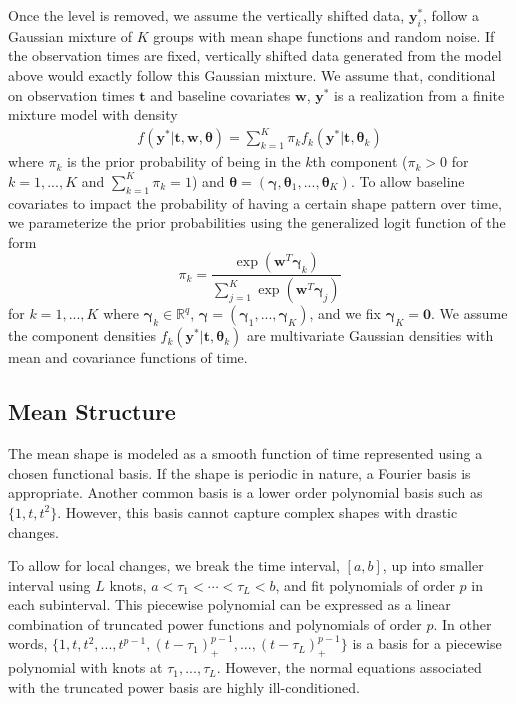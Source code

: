 \documentclass[12pt]{article}
\newcommand{\B}[0]{\mathbf}
\newcommand{\bs}[0]{\boldsymbol}
\begin{document}
Once the level is removed, we assume the vertically shifted data, $\B y_{i}^{*}$, follow a Gaussian mixture of $K$ groups with mean shape functions and random noise. If the observation times are fixed, vertically shifted data generated from the model above would exactly follow this Gaussian mixture. We assume that, conditional on observation times $\B t$ and baseline covariates $\B w$, $\B y^{*}$ is a realization from a finite mixture model with density
\begin{align*}
 f(\B y^{*}|\B t,\B w,\bs\theta) =  \sum^{K}_{k=1}\pi_{k}f_{k}( \B y^{*}|\B t,\bs\theta_{k})
\end{align*}
where $\pi_{k}$ is the prior probability of being in the $k$th component ($\pi_{k}>0$ for $k=1,...,K$ and $\sum^{K}_{k=1}\pi_{k}=1$) and $\bs\theta = (\bs\gamma,\bs\theta_{1},...,\bs\theta_{K})$. To allow baseline covariates to impact the probability of having a certain shape pattern over time, we parameterize the prior probabilities using the generalized logit function of the form
$$\pi_{k}=\frac{\exp(\B w^{T}\bs\gamma_{k})}{\sum_{j=1}^{K}\exp(\B w^{T}\bs\gamma_{j})}$$ 
for $k=1,...,K$ where $\bs \gamma_{k}\in\mathbb{R}^{q}$, $\bs\gamma = (\bs\gamma_{1},...,\bs\gamma_{K})$, and we fix $\bs\gamma_{K}=\B 0$. We assume the component densities $f_{k}(\B y^{*}|\B t,\bs\theta_{k})$ are multivariate Gaussian densities with mean and covariance functions of time.

\subsection{Mean Structure}
The mean shape is modeled as a smooth function of time represented using a chosen functional basis. If the shape is periodic in nature, a Fourier basis is appropriate. Another common basis is a lower order polynomial basis such as $\{1, t, t^{2}\}$. However, this basis cannot capture complex shapes with drastic changes. 

To allow for local changes, we break the time interval, $[a,b]$, up into smaller interval using $L$ knots, $a<\tau_{1}<\cdots<\tau_{L}<b$, and fit polynomials of order $p$ in each subinterval. This piecewise polynomial can be expressed as a linear combination of truncated power functions and polynomials of order $p$. In other words,
$\{1,t,t^{2},...,t^{p-1},(t-\tau_{1})_{+}^{p-1},...,(t-\tau_{L})_{+}^{p-1}\}$
is a basis for a piecewise polynomial with knots at $\tau_{1},...,\tau_{L}$. However, the normal equations associated with the truncated power basis are highly ill-conditioned. 
\end{document}
